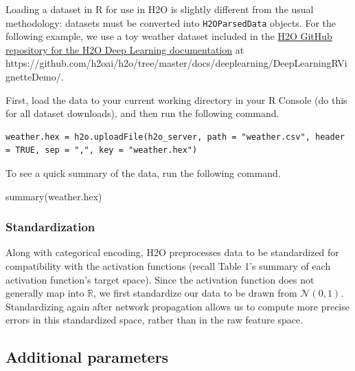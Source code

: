 \documentclass{article}[11pt]
\begin{document}
Loading a dataset in R for use in H2O is slightly different from the usual methodology: datasets must be converted into \texttt{H2OParsedData} objects. For the following example, we use a toy weather dataset included in the \href{https://github.com/h2oai/h2o/tree/master/docs/deeplearning/DeepLearningRVignetteDemo}{H2O GitHub repository for the H2O Deep Learning documentation} at \\https://github.com/h2oai/h2o/tree/master/docs/deeplearning/DeepLearningRVignetteDemo/. 

First, load the data to your current working directory in your R Console (do this for all dataset downloads), and then run the following command.

\begin{lstlisting}[breaklines,basicstyle=\ttfamily]
weather.hex = h2o.uploadFile(h2o_server, path = "weather.csv", header = TRUE, sep = ",", key = "weather.hex")
\end{lstlisting}
\normalsize

\bigskip
\noindent
To see a quick summary of the data, run the following command.
\begin{spverbatim}
summary(weather.hex)
\end{spverbatim}

\subsubsection{Standardization} 

Along with categorical encoding, H2O preprocesses data to be standardized for compatibility with the activation functions (recall Table 1's summary of each activation function's target space). Since the activation function does not generally map into $\mathbb{R}$, we first standardize our data to be drawn from $\mathcal{N}(0,1)$. Standardizing again after network propagation allows us to compute more precise errors in this standardized space, rather than in the raw feature space. 

\subsection{Additional parameters} 
\end{document}
